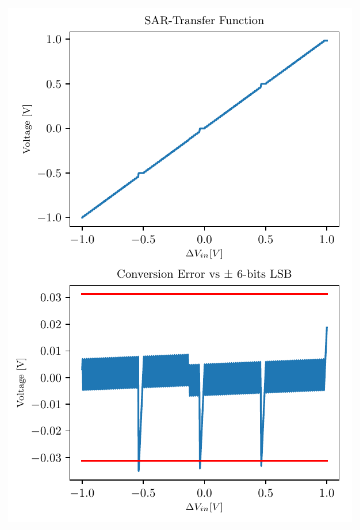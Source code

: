 \begin{figure}[htp]
	\centering
	\begin{subfigure}[b]{0.4\textwidth}
		\centering
		\includegraphics[width=\textwidth]{Chapter4/Figs/results/sar_resilience/sar-osr6-ideal-40mVref-10mVoffset.pdf}
	\end{subfigure}
	\begin{subfigure}[b]{0.4\textwidth}
		\centering

\end{subfigure}
\end{figure}
